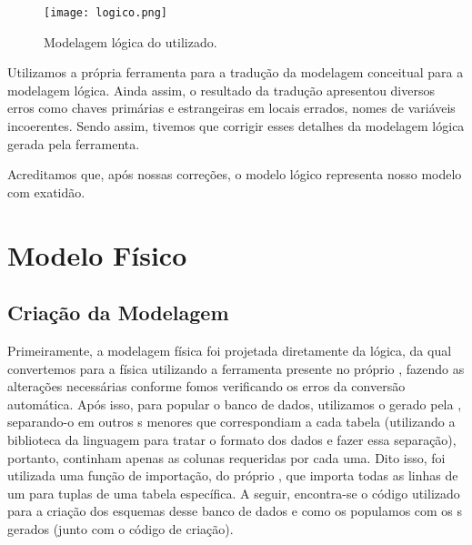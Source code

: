   \vspace{2cm}
  \begin{figure}[H]
    \centering
    \texttt{[image: logico.png]}
    \caption{Modelagem lógica do  utilizado.}
  \end{figure}

  Utilizamos a própria ferramenta  para a tradução da modelagem conceitual para a modelagem lógica. Ainda assim, o resultado da tradução apresentou diversos erros como chaves primárias e estrangeiras em locais errados, nomes de variáveis incoerentes. Sendo assim, tivemos que corrigir esses detalhes da modelagem lógica gerada pela ferramenta.

  Acreditamos que, após nossas correções, o modelo lógico representa nosso modelo com exatidão.

\newpage
\section{Modelo Físico}
\subsection{Criação da Modelagem}

  Primeiramente, a modelagem física foi projetada diretamente da lógica, da qual convertemos para a física utilizando a ferramenta presente no próprio , fazendo as alterações necessárias conforme fomos verificando os erros da conversão automática. Após isso, para popular o banco de dados, utilizamos o  gerado pela , separando-o em outros s menores que correspondiam a cada tabela (utilizando a biblioteca  da linguagem  para tratar o formato dos dados e fazer essa separação), portanto, continham apenas as colunas requeridas por cada uma. Dito isso, foi utilizada uma função de importação, do próprio , que importa todas as linhas de um  para tuplas de uma tabela específica. A seguir, encontra-se o código utilizado para a criação dos esquemas desse banco de dados e como os populamos com os s gerados (junto com o código de criação).

